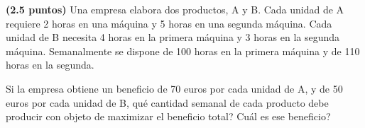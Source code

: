 
\textbf{(2.5 puntos)} Una empresa elabora dos productos, A y B. Cada unidad de A requiere 2 horas en una máquina y 5 horas en una segunda máquina. Cada unidad de B necesita 4 horas en la primera máquina y 3 horas en la segunda máquina. Semanalmente se dispone de 100 horas en la primera máquina y de 110 horas en la segunda.

Si la empresa obtiene un beneficio de 70 euros por cada unidad de A, y de 50 euros por cada unidad de B, \textquestiondown{}qué cantidad semanal de cada producto debe producir con objeto de maximizar el beneficio total? \textquestiondown{}Cuál es ese beneficio?

